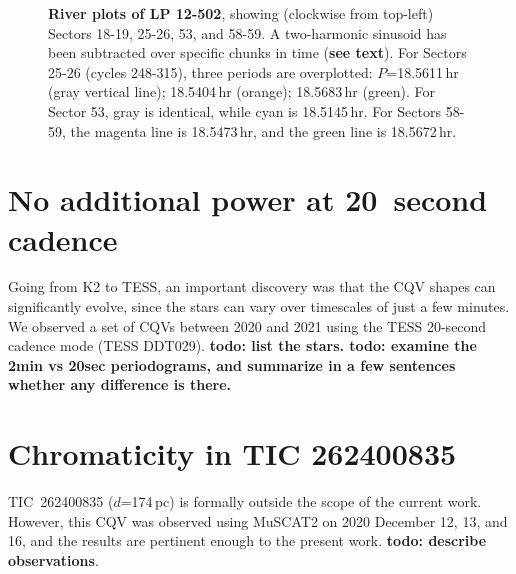 \documentclass[11pt,twocolumn,tighten]{aastex63}
\begin{document}
\begin{figure*}[!t]
	\begin{center}
	\vspace{-1cm}
	\end{center}
	\vspace{-0.4cm}
	\caption{
    {\bf River plots of LP 12-502}, showing (clockwise from top-left)
    Sectors 18-19, 25-26, 53, and 58-59.  A two-harmonic sinusoid has
    been subtracted over specific chunks in time ({\bf see text}).
    For Sectors 25-26 (cycles 248-315), three periods are overplotted:
    $P$=18.5611\,hr (gray vertical line); 18.5404\,hr (orange); 18.5683\,hr (green).
    For Sector 53, gray is identical, while cyan is 18.5145\,hr.
    For Sectors 58-59, the magenta line is 18.5473\,hr, and the green
    line is 18.5672\,hr.
	}
	\label{fig:lpriver0}
\end{figure*}


\section{No additional power at 20~second cadence}

Going from K2 to TESS, an important discovery was that the CQV shapes
can significantly evolve, since the stars can vary over timescales of just a few minutes.
We observed a set of CQVs between 2020 and 2021 using the TESS 20-second
cadence mode (TESS DDT029).
{\bf todo: list the stars.  todo: examine the 2min vs 20sec periodograms, and summarize in a few
sentences whether any difference is there.}



\section{Chromaticity in TIC 262400835}

TIC~262400835 ($d$=174\,pc) is formally outside the scope of the
current work.  However, this CQV was observed using MuSCAT2 on 2020
December 12, 13, and 16, and the results are pertinent enough to the
present work.
{\bf todo: describe observations}.
\end{document}
